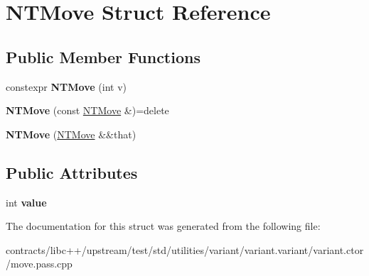 \hypertarget{struct_n_t_move}{}\section{N\+T\+Move Struct Reference}
\label{struct_n_t_move}
\subsection*{Public Member Functions}
\begin{DoxyCompactItemize}
\item 
\mbox{\label{struct_n_t_move_aba5f616c90df231d6b6bb513966d159b}} 
constexpr {\bfseries N\+T\+Move} (int v)
\item 
\mbox{\label{struct_n_t_move_a138c684075d0866aab488ec5689636d9}} 
{\bfseries N\+T\+Move} (const \mbox{\hyperlink{struct_n_t_move}{N\+T\+Move}} \&)=delete
\item 
\mbox{\label{struct_n_t_move_ad83e7ebe0e2d79b3c30aee5bbe52414d}} 
{\bfseries N\+T\+Move} (\mbox{\hyperlink{struct_n_t_move}{N\+T\+Move}} \&\&that)
\end{DoxyCompactItemize}
\subsection*{Public Attributes}
\begin{DoxyCompactItemize}
\item 
\mbox{\label{struct_n_t_move_aa0714840f81dd611a78367e693e1c7be}} 
int {\bfseries value}
\end{DoxyCompactItemize}


The documentation for this struct was generated from the following file\+:\begin{DoxyCompactItemize}
\item 
contracts/libc++/upstream/test/std/utilities/variant/variant.\+variant/variant.\+ctor/move.\+pass.\+cpp\end{DoxyCompactItemize}
